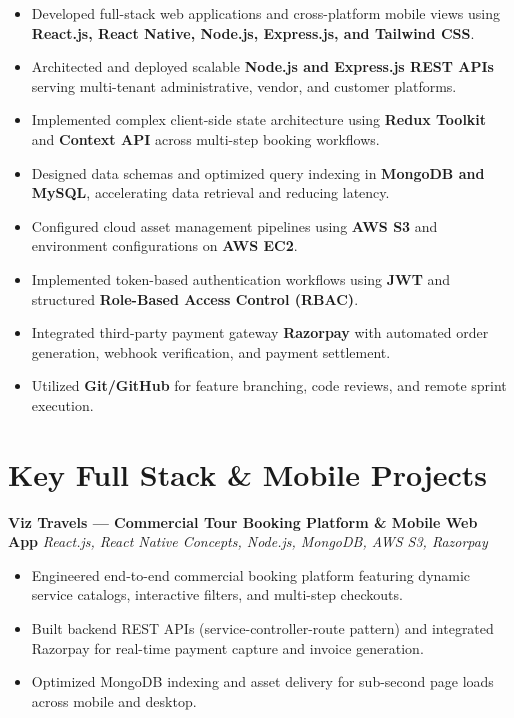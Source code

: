 \documentclass[a4paper,10pt]{article}
\begin{document}
\begin{itemize}

    \item Developed full-stack web applications and cross-platform mobile views using \textbf{React.js, React Native, Node.js, Express.js, and Tailwind CSS}.

    \item Architected and deployed scalable \textbf{Node.js and Express.js REST APIs} serving multi-tenant administrative, vendor, and customer platforms.

    \item Implemented complex client-side state architecture using \textbf{Redux Toolkit} and \textbf{Context API} across multi-step booking workflows.

    \item Designed data schemas and optimized query indexing in \textbf{MongoDB and MySQL}, accelerating data retrieval and reducing latency.

    \item Configured cloud asset management pipelines using \textbf{AWS S3} and environment configurations on \textbf{AWS EC2}.

    \item Implemented token-based authentication workflows using \textbf{JWT} and structured \textbf{Role-Based Access Control (RBAC)}.

    \item Integrated third-party payment gateway \textbf{Razorpay} with automated order generation, webhook verification, and payment settlement.

    \item Utilized \textbf{Git/GitHub} for feature branching, code reviews, and remote sprint execution.

\end{itemize}

\section*{Key Full Stack & Mobile Projects}

\textbf{Viz Travels --- Commercial Tour Booking Platform \& Mobile Web App}
\hfill
\textit{React.js, React Native Concepts, Node.js, MongoDB, AWS S3, Razorpay}

\begin{itemize}

    \item Engineered end-to-end commercial booking platform featuring dynamic service catalogs, interactive filters, and multi-step checkouts.

    \item Built backend REST APIs (service-controller-route pattern) and integrated Razorpay for real-time payment capture and invoice generation.

    \item Optimized MongoDB indexing and asset delivery for sub-second page loads across mobile and desktop.

\end{itemize}
\end{document}
